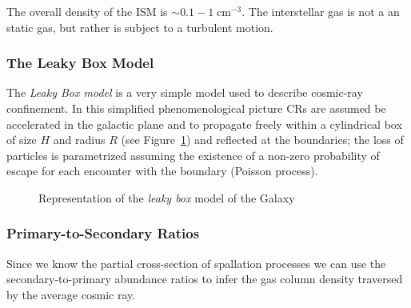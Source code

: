 \documentclass[
  letterpaper,
  DIV=11,
  numbers=noendperiod]{scrreprt}
\begin{document}
The overall density of the ISM is \(\sim 0.1-1 \;\mathrm{cm}^{-3}\). The
interstellar gas is not a an static gas, but rather is subject to a
turbulent motion.

\subsubsection*{The Leaky Box Model}\label{the-leaky-box-model}

The \emph{Leaky Box model} is a very simple model used to describe
cosmic-ray confinement. In this simplified phenomenological picture CRs
are assumed be accelerated in the galactic plane and to propagate freely
within a cylindrical box of size \(H\) and radius \(R\) (see
Figure~\ref{fig-leakybox}) and reflected at the boundaries; the loss of
particles is parametrized assuming the existence of a non-zero
probability of escape for each encounter with the boundary (Poisson
process).

\begin{figure}


\caption{\label{fig-leakybox}Representation of the \emph{leaky box}
model of the Galaxy}

\end{figure}%

\subsubsection*{Primary-to-Secondary
Ratios}\label{primary-to-secondary-ratios}

Since we know the partial cross-section of spallation processes we can
use the secondary-to-primary abundance ratios to infer the gas column
density traversed by the average cosmic ray.
\end{document}
